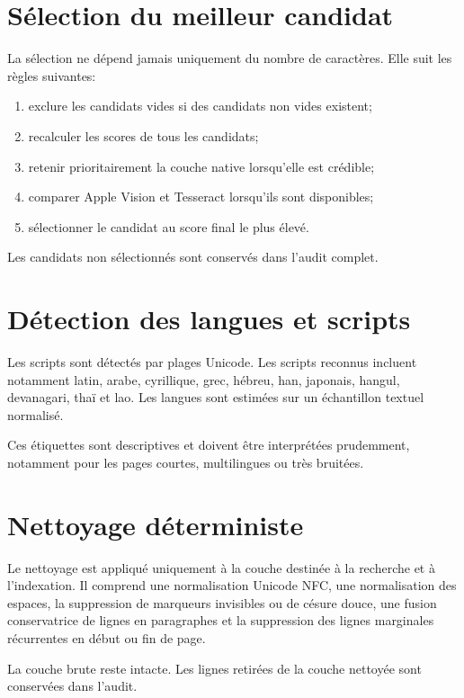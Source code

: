 \documentclass[11pt,a4paper]{article}
\begin{document}
\section{Sélection du meilleur candidat}

La sélection ne dépend jamais uniquement du nombre de caractères. Elle suit les règles suivantes:

\begin{enumerate}
  \item exclure les candidats vides si des candidats non vides existent;
  \item recalculer les scores de tous les candidats;
  \item retenir prioritairement la couche native lorsqu'elle est crédible;
  \item comparer Apple Vision et Tesseract lorsqu'ils sont disponibles;
  \item sélectionner le candidat au score final le plus élevé.
\end{enumerate}

Les candidats non sélectionnés sont conservés dans l'audit complet.

\section{Détection des langues et scripts}

Les scripts sont détectés par plages Unicode. Les scripts reconnus incluent notamment latin, arabe, cyrillique, grec, hébreu, han, japonais, hangul, devanagari, thaï et lao. Les langues sont estimées sur un échantillon textuel normalisé.

Ces étiquettes sont descriptives et doivent être interprétées prudemment, notamment pour les pages courtes, multilingues ou très bruitées.

\section{Nettoyage déterministe}

Le nettoyage est appliqué uniquement à la couche destinée à la recherche et à l'indexation. Il comprend une normalisation Unicode NFC, une normalisation des espaces, la suppression de marqueurs invisibles ou de césure douce, une fusion conservatrice de lignes en paragraphes et la suppression des lignes marginales récurrentes en début ou fin de page.

La couche brute reste intacte. Les lignes retirées de la couche nettoyée sont conservées dans l'audit.
\end{document}
